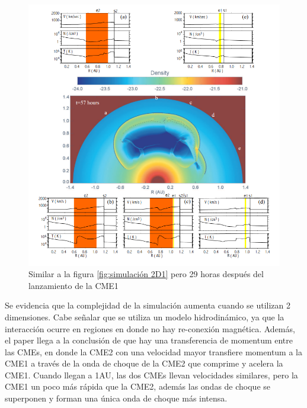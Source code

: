 \begin{figure}[H]
    \centering
    \includegraphics[width=0.8\linewidth]{imag/2D2.png}
    \caption[Simulación en 2D de dos CMEs hecha por \cite{gonzalez-esparza-2004}, 29 horas después del lanzamiento de la primera CME]{Similar a la figura \ref{fig:simulación 2D1} pero 29 horas después del lanzamiento de la CME1}
    \label{fig:simulación 2D2}
\end{figure}
Se evidencia que la complejidad de la simulación aumenta cuando se utilizan 2 dimensiones. Cabe señalar que se utiliza un modelo hidrodinámico, ya que la interacción ocurre en regiones en donde no hay re-conexión magnética. Además, el paper llega a la conclusión de que hay una transferencia de momentum entre las CMEs, en donde la CME2 con una velocidad mayor transfiere momentum a la CME1 a través de la onda de choque de la CME2 que comprime y acelera la CME1. Cuando llegan a 1AU, las dos \acp{CME} llevan velocidades similares, pero la CME1 un poco más rápida que la CME2, además las ondas de choque se superponen y forman una única onda de choque más intensa.


